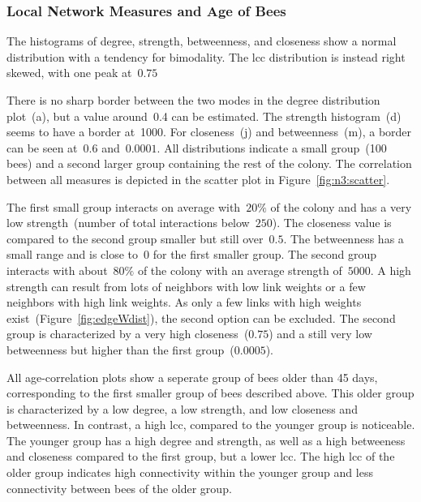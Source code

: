 \subsubsection{Local Network Measures and Age of Bees}
The histograms of degree, strength, betweenness, and closeness show a normal distribution with a tendency for bimodality. The lcc distribution is instead right skewed, with one peak at~$0.75$

There is no sharp border between the two modes in the degree distribution plot~(a), but a value around~0.4 can be estimated.
The strength histogram~(d) seems to have a border at~1000.
For closeness~(j) and betweenness~(m), a border can be seen at~$0.6$ and~$0.0001$.
All distributions indicate a small group~(100 bees) and a second larger group containing the rest of the colony.
The correlation between all measures is depicted in the scatter plot in Figure~\ref{fig:n3:scatter}.  

The first small group interacts on average with~$20\%$ of the colony and has a very low strength~(number of total interactions below~$250$).
The closeness value is compared to the second group smaller but still over~$0.5$.
The betweenness has a small range and is close to~$0$ for the first smaller group.
The second group interacts with about~$80\%$ of the colony with an average strength of~$5000$.
A high strength can result from lots of neighbors with low link weights or a few neighbors with high link weights.
As only a few links with high weights exist~(Figure~\ref{fig:edgeWdist}), the second option can be excluded. The second group is characterized by a very high closeness~($0.75$) and a still very low betweenness but higher than the first group~($0.0005$).

All age-correlation plots show a seperate group of bees older than 45 days, corresponding to the first smaller group of bees described above.
This older group is characterized by a low degree, a low strength, and low closeness and betweenness.
In contrast, a high lcc, compared to the younger group is noticeable.
The younger group has a high degree and strength, as well as a high betweeness and closeness compared to the first group, but a lower lcc.
The high lcc of the older group indicates high connectivity within the younger group and less connectivity between bees of the older group.

